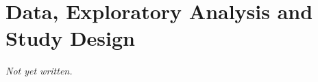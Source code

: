 \chapter{Data, Exploratory Analysis and Study Design}\label{ch:eda-study-design}


\textit{Not yet written.}
